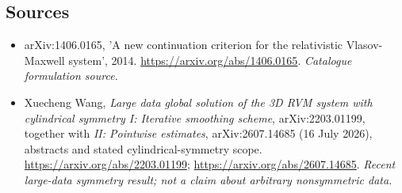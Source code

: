 \documentclass[11pt,a4paper]{article}
\begin{document}
\subsection{Sources}
\begin{itemize}\raggedright
\item[\textnormal{[S1]}]\hypertarget{source:30006039:1}{} arXiv:1406.0165, 'A new continuation criterion for the relativistic Vlasov-Maxwell system', 2014.
\url{https://arxiv.org/abs/1406.0165}.
{\small\textit{Catalogue formulation source.}}
\item[\textnormal{[E1]}]\hypertarget{extra:30006039:1}{} Xuecheng Wang,
\emph{Large data global solution of the 3D RVM system with cylindrical symmetry I:
Iterative smoothing scheme}, arXiv:2203.01199, together with
\emph{II: Pointwise estimates}, arXiv:2607.14685 (16 July 2026), abstracts
and stated cylindrical-symmetry scope.
\url{https://arxiv.org/abs/2203.01199};
\url{https://arxiv.org/abs/2607.14685}.
{\small\textit{Recent large-data symmetry result; not a claim about arbitrary nonsymmetric data.}}
\end{itemize}
\end{document}

